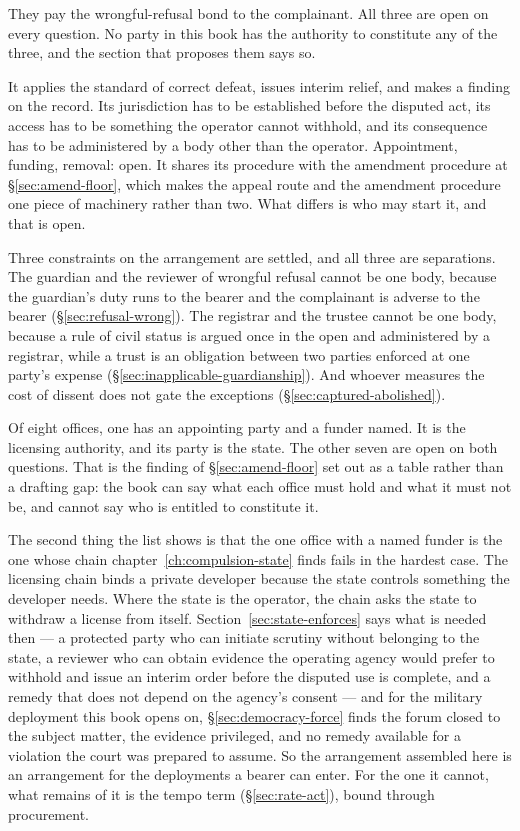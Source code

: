 They pay the wrongful-refusal bond to the complainant. All three are open on every question. No party in this book has the authority to constitute any of the three, and the section that proposes them says so.

It applies the standard of correct defeat, issues interim relief, and makes a finding on the record. Its jurisdiction has to be established before the disputed act, its access has to be something the operator cannot withhold, and its consequence has to be administered by a body other than the operator. Appointment, funding, removal: open. It shares its procedure with the amendment procedure at §\ref{sec:amend-floor}, which makes the appeal route and the amendment procedure one piece of machinery rather than two. What differs is who may start it, and that is open.

Three constraints on the arrangement are settled, and all three are separations. The guardian and the reviewer of wrongful refusal cannot be one body, because the guardian's duty runs to the bearer and the complainant is adverse to the bearer (§\ref{sec:refusal-wrong}). The registrar and the trustee cannot be one body, because a rule of civil status is argued once in the open and administered by a registrar, while a trust is an obligation between two parties enforced at one party's expense (§\ref{sec:inapplicable-guardianship}). And whoever measures the cost of dissent does not gate the exceptions (§\ref{sec:captured-abolished}).

Of eight offices, one has an appointing party and a funder named. It is the licensing authority, and its party is the state. The other seven are open on both questions. That is the finding of §\ref{sec:amend-floor} set out as a table rather than a drafting gap: the book can say what each office must hold and what it must not be, and cannot say who is entitled to constitute it.

The second thing the list shows is that the one office with a named funder is the one whose chain chapter~\ref{ch:compulsion-state} finds fails in the hardest case. The licensing chain binds a private developer because the state controls something the developer needs. Where the state is the operator, the chain asks the state to withdraw a license from itself. Section~\ref{sec:state-enforces} says what is needed then — a protected party who can initiate scrutiny without belonging to the state, a reviewer who can obtain evidence the operating agency would prefer to withhold and issue an interim order before the disputed use is complete, and a remedy that does not depend on the agency's consent — and for the military deployment this book opens on, §\ref{sec:democracy-force} finds the forum closed to the subject matter, the evidence privileged, and no remedy available for a violation the court was prepared to assume. So the arrangement assembled here is an arrangement for the deployments a bearer can enter. For the one it cannot, what remains of it is the tempo term (§\ref{sec:rate-act}), bound through procurement.

